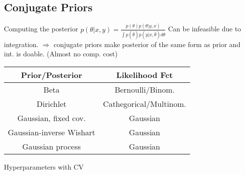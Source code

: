 \subsection{Conjugate Priors}

Computing the posterior $p(\theta|x,y) = \frac{p(\theta)p(\theta|y,x)}{\int p(\hat\theta)p(y|x,\hat\theta)d\theta}$ Can be infeasible due to integration. $\Rightarrow$ conjugate priors make posterior of the same form as prior and int. is doable. (Almost no comp. cost)

\begin{center}
    \begin{tabular}{|c|c|}
        \hline
        \textbf{Prior/Posterior} & \textbf{Likelihood Fct} \\
        \hline
        Beta & Bernoulli/Binom.\\
        \hline
        Dirichlet & Cathegorical/Multinom.\\
        \hline
        Gaussian, fixed cov. & Gaussian  \\
        \hline
        Gaussian-inverse Wishart & Gaussian  \\
        \hline
        Gaussian process & Gaussian  \\
        \hline
    \end{tabular}
\end{center}

Hyperparameters with CV

